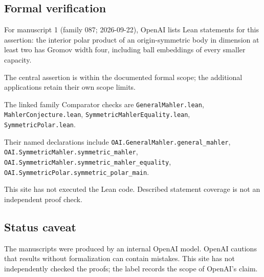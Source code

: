\documentclass[11pt]{article}
\begin{document}
\subsection{Formal verification}
For manuscript 1 (family 087; 2026-09-22), OpenAI lists Lean statements for this assertion: the interior polar product of an origin-symmetric body in dimension at least two has Gromov width four, including ball embeddings of every smaller capacity.

The central assertion is within the documented formal scope; the additional applications retain their own scope limits.

The linked family Comparator checks are \texttt{GeneralMahler.lean}, \texttt{MahlerConjecture.lean}, \texttt{SymmetricMahlerEquality.lean}, \texttt{SymmetricPolar.lean}.

Their named declarations include \texttt{OAI.GeneralMahler.general\_mahler}, \texttt{OAI.SymmetricMahler.symmetric\_mahler}, \texttt{OAI.SymmetricMahler.symmetric\_mahler\_equality}, \texttt{OAI.SymmetricPolar.symmetric\_polar\_main}.

This site has not executed the Lean code. Described statement coverage is not an independent proof check.

\subsection{Status caveat}
The manuscripts were produced by an internal OpenAI model. OpenAI cautions that results without formalization can contain mistakes. This site has not independently checked the proofs; the label records the scope of OpenAI's claim.
\end{document}
